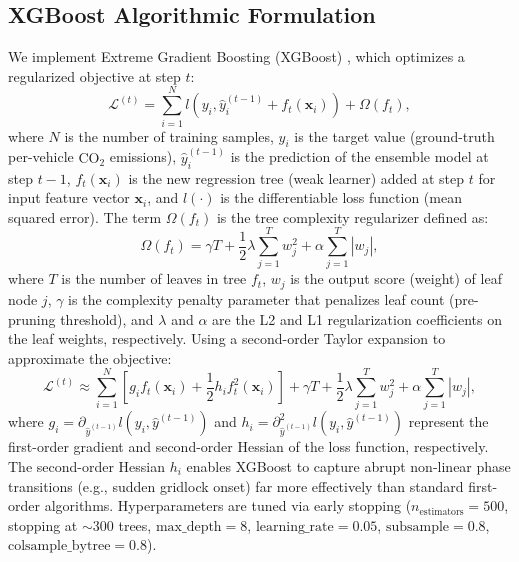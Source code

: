 \documentclass[lettersize,journal]{IEEEtran}
\begin{document}
\subsection{XGBoost Algorithmic Formulation}
We implement Extreme Gradient Boosting (XGBoost) \cite{Chen2016}, which optimizes a regularized objective at step $t$:
\begin{equation}
\mathcal{L}^{(t)} = \sum_{i=1}^N l\left( y_i, \hat{y}_i^{(t-1)} + f_t(\mathbf{x}_i) \right) + \Omega(f_t),
\end{equation}
where $N$ is the number of training samples, $y_i$ is the target value (ground-truth per-vehicle $\text{CO}_2$ emissions), $\hat{y}_i^{(t-1)}$ is the prediction of the ensemble model at step $t-1$, $f_t(\mathbf{x}_i)$ is the new regression tree (weak learner) added at step $t$ for input feature vector $\mathbf{x}_i$, and $l(\cdot)$ is the differentiable loss function (mean squared error). The term $\Omega(f_t)$ is the tree complexity regularizer defined as:
\begin{equation}
\Omega(f_t) = \gamma T + \frac{1}{2}\lambda \sum_{j=1}^T w_j^2 + \alpha \sum_{j=1}^T |w_j|,
\end{equation}
where $T$ is the number of leaves in tree $f_t$, $w_j$ is the output score (weight) of leaf node $j$, $\gamma$ is the complexity penalty parameter that penalizes leaf count (pre-pruning threshold), and $\lambda$ and $\alpha$ are the L2 and L1 regularization coefficients on the leaf weights, respectively. Using a second-order Taylor expansion to approximate the objective:
\begin{equation}
\mathcal{L}^{(t)} \approx \sum_{i=1}^N \left[ g_i f_t(\mathbf{x}_i) + \frac{1}{2} h_i f_t^2(\mathbf{x}_i) \right] + \gamma T + \frac{1}{2}\lambda \sum_{j=1}^T w_j^2 + \alpha \sum_{j=1}^T |w_j|,
\end{equation}
where $g_i = \partial_{\hat{y}^{(t-1)}} l(y_i, \hat{y}^{(t-1)})$ and $h_i = \partial^2_{\hat{y}^{(t-1)}} l(y_i, \hat{y}^{(t-1)})$ represent the first-order gradient and second-order Hessian of the loss function, respectively. The second-order Hessian $h_i$ enables XGBoost to capture abrupt non-linear phase transitions (e.g., sudden gridlock onset) far more effectively than standard first-order algorithms. Hyperparameters are tuned via early stopping ($n_{\text{estimators}} = 500$, stopping at $\sim 300$ trees, $\text{max\_depth} = 8$, $\text{learning\_rate} = 0.05$, $\text{subsample} = 0.8$, $\text{colsample\_bytree} = 0.8$).
\end{document}
